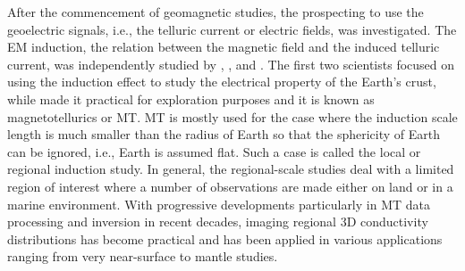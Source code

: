 
	After the commencement of geomagnetic studies, the prospecting to use the geoelectric signals, i.e., the telluric current or electric fields, was investigated.
	 The EM induction, the relation between the magnetic field and the induced telluric current, was independently studied by \citet{rikitake1946a},  \citet{tikhonov1950a}, and \citet{cagniard1953a}. 
	The first two scientists focused on using the induction effect to study the electrical property of the Earth's crust, while \citet{cagniard1953a} made it practical for exploration purposes and it is known as magnetotellurics or MT.
	MT is mostly used for the case where the induction scale length is much smaller than the radius of Earth so that the sphericity of Earth can be ignored, i.e., Earth is assumed flat. 
	Such a case is called the local or regional induction study. 
	In general, the regional-scale studies deal with a limited region of interest where a number of observations are made either on land or in a marine environment.
	With progressive developments particularly in MT data processing \citep[e.g.,][]{egbert1997a, chave2004a, smirnov2012a} and inversion \citep[e.g.,][]{ sasaki2001a, siripunvaraporn2005a, uchida2006a, avdeev2009a, kelbert2014a} in recent decades, imaging regional 3D conductivity distributions has become practical and has been applied in various applications ranging from very near-surface to mantle studies.



